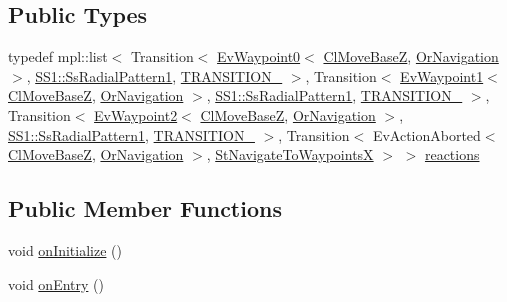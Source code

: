 \subsection*{Public Types}
\begin{DoxyCompactItemize}
\item 
typedef mpl\+::list$<$ Transition$<$ \hyperlink{structmove__base__z__client_1_1EvWaypoint0}{Ev\+Waypoint0}$<$ \hyperlink{classmove__base__z__client_1_1ClMoveBaseZ}{Cl\+Move\+BaseZ}, \hyperlink{classsm__dance__bot__2_1_1OrNavigation}{Or\+Navigation} $>$, \hyperlink{structsm__dance__bot__2_1_1SS1_1_1SsRadialPattern1}{S\+S1\+::\+Ss\+Radial\+Pattern1}, \hyperlink{structsm__dance__bot__2_1_1StNavigateToWaypointsX_1_1TRANSITION__1}{T\+R\+A\+N\+S\+I\+T\+I\+O\+N\+\_} $>$, Transition$<$ \hyperlink{structmove__base__z__client_1_1EvWaypoint1}{Ev\+Waypoint1}$<$ \hyperlink{classmove__base__z__client_1_1ClMoveBaseZ}{Cl\+Move\+BaseZ}, \hyperlink{classsm__dance__bot__2_1_1OrNavigation}{Or\+Navigation} $>$, \hyperlink{structsm__dance__bot__2_1_1SS1_1_1SsRadialPattern1}{S\+S1\+::\+Ss\+Radial\+Pattern1}, \hyperlink{structsm__dance__bot__2_1_1StNavigateToWaypointsX_1_1TRANSITION__2}{T\+R\+A\+N\+S\+I\+T\+I\+O\+N\+\_} $>$, Transition$<$ \hyperlink{structmove__base__z__client_1_1EvWaypoint2}{Ev\+Waypoint2}$<$ \hyperlink{classmove__base__z__client_1_1ClMoveBaseZ}{Cl\+Move\+BaseZ}, \hyperlink{classsm__dance__bot__2_1_1OrNavigation}{Or\+Navigation} $>$, \hyperlink{structsm__dance__bot__2_1_1SS1_1_1SsRadialPattern1}{S\+S1\+::\+Ss\+Radial\+Pattern1}, \hyperlink{structsm__dance__bot__2_1_1StNavigateToWaypointsX_1_1TRANSITION__3}{T\+R\+A\+N\+S\+I\+T\+I\+O\+N\+\_} $>$, Transition$<$ Ev\+Action\+Aborted$<$ \hyperlink{classmove__base__z__client_1_1ClMoveBaseZ}{Cl\+Move\+BaseZ}, \hyperlink{classsm__dance__bot__2_1_1OrNavigation}{Or\+Navigation} $>$, \hyperlink{structsm__dance__bot__2_1_1StNavigateToWaypointsX}{St\+Navigate\+To\+WaypointsX} $>$ $>$ \hyperlink{structsm__dance__bot__2_1_1StNavigateToWaypointsX_a324e1d36077605571edf69adac5e7d26}{reactions}
\end{DoxyCompactItemize}
\subsection*{Public Member Functions}
\begin{DoxyCompactItemize}
\item 
void \hyperlink{structsm__dance__bot__2_1_1StNavigateToWaypointsX_a6e484f4b217fc98428d211975419de60}{on\+Initialize} ()
\item 
void \hyperlink{structsm__dance__bot__2_1_1StNavigateToWaypointsX_a57b8b85e63f37bbbc84049126fb4cf9a}{on\+Entry} ()
\end{DoxyCompactItemize}
